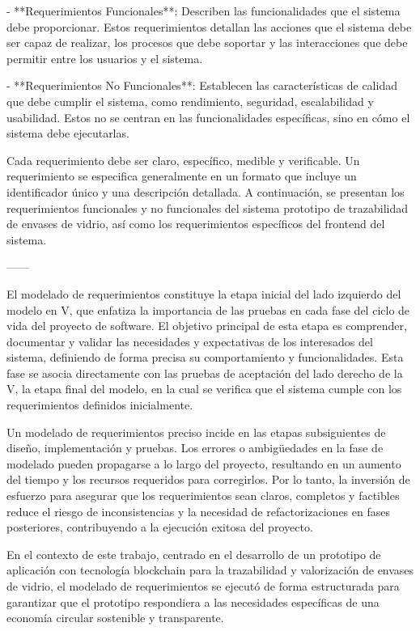 - **Requerimientos Funcionales**: Describen las funcionalidades que el sistema debe proporcionar. Estos requerimientos detallan las acciones que el sistema debe ser capaz de realizar, los procesos que debe soportar y las interacciones que debe permitir entre los usuarios y el sistema.

- **Requerimientos No Funcionales**: Establecen las características de calidad que debe cumplir el sistema, como rendimiento, seguridad, escalabilidad y usabilidad. Estos no se centran en las funcionalidades específicas, sino en cómo el sistema debe ejecutarlas.

Cada requerimiento debe ser claro, específico, medible y verificable. Un requerimiento se especifica generalmente en un formato que incluye un identificador único y una descripción detallada. A continuación, se presentan los requerimientos funcionales y no funcionales del sistema prototipo de trazabilidad de envases de vidrio, así como los requerimientos específicos del frontend del sistema.

------

El modelado de requerimientos constituye la etapa inicial del lado izquierdo del modelo en V, que enfatiza la importancia de las pruebas en cada fase del ciclo de vida del proyecto de software. El objetivo principal de esta etapa es comprender, documentar y validar las necesidades y expectativas de los interesados del sistema, definiendo de forma precisa su comportamiento y funcionalidades. Esta fase se asocia directamente con las pruebas de aceptación del lado derecho de la V, la etapa final del modelo, en la cual se verifica que el sistema cumple con los requerimientos definidos inicialmente.

Un modelado de requerimientos preciso incide en las etapas subsiguientes de diseño, implementación y pruebas. Los errores o ambigüedades en la fase de modelado pueden propagarse a lo largo del proyecto, resultando en un aumento del tiempo y los recursos requeridos para corregirlos. Por lo tanto, la inversión de esfuerzo para asegurar que los requerimientos sean claros, completos y factibles reduce el riesgo de inconsistencias y la necesidad de refactorizaciones en fases posteriores, contribuyendo a la ejecución exitosa del proyecto.

En el contexto de este trabajo, centrado en el desarrollo de un prototipo de aplicación con tecnología blockchain para la trazabilidad y valorización de envases de vidrio, el modelado de requerimientos se ejecutó de forma estructurada para garantizar que el prototipo respondiera a las necesidades específicas de una economía circular sostenible y transparente.

